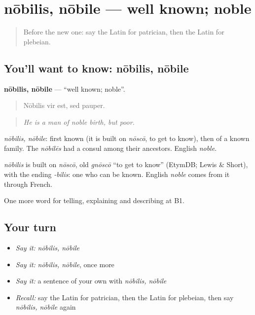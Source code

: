 \section[nōbilis, nōbile]{nōbilis, nōbile — well known; noble}

\label{lesson:LA-C382-nobilis}



\begin{quote}
Before the new one: say the Latin for patrician, then the Latin for plebeian.
\end{quote}

\subsection*{You'll want to know: nōbilis, nōbile}
\textbf{nōbilis, nōbile} — \textquotedblleft{}well known; noble\textquotedblright{}.

\begin{quote}
Nōbilis vir est, sed pauper.
\end{quote}

\begin{quote}
\emph{He is a man of noble birth, but poor.}
\end{quote}

\emph{nōbilis, nōbile}: first known (it is built on \emph{nōscō}, to get to know), then of a known family. The \emph{nōbilēs} had a consul among their ancestors. English \emph{noble}.

\begin{cousinweb}
\emph{nōbilis} is built on \emph{nōscō}, old \emph{gnōscō} \textquotedblleft{}to get to know\textquotedblright{} (EtymDB; Lewis \& Short), with the ending \emph{-bilis}: one who can be known. English \emph{noble} comes from it through French.
\end{cousinweb}

\begin{grammarlens}[title={What you've built}]
One more word for telling, explaining and describing at B1.
\end{grammarlens}

\subsection*{Your turn}
\begin{itemize}
\raggedright
  \item \emph{Say it:} \emph{nōbilis, nōbile}
  \item \emph{Say it:} \emph{nōbilis, nōbile}, once more
  \item \emph{Say it:} a sentence of your own with \emph{nōbilis, nōbile}
  \item \emph{Recall:} say the Latin for patrician, then the Latin for plebeian, then say \emph{nōbilis, nōbile} again
\end{itemize}

